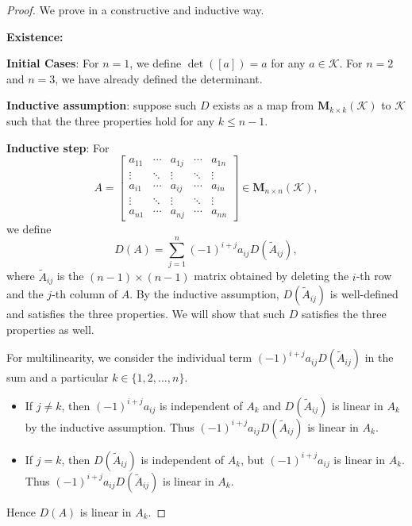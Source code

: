 \documentclass{ctexart}
\begin{document}
    \begin{proof}
        We prove in a constructive and inductive way.

        \noindent
        \textbf{Existence:} 
        
        \textbf{Initial Cases}: For $n=1$, we define $\det([a]) = a$ for any $a \in \mathcal{K}$. For $n=2$ and $n=3$, we have already defined the determinant.

        \textbf{Inductive assumption}: suppose such $D$ exists as a map from $\mathbf{M}_{k \times k}(\mathcal{K})$ to $\mathcal{K}$ such that the three properties hold for any $ k \le n-1$.

        \textbf{Inductive step}: For
        \[
        A = \begin{bmatrix}
            a_{11} & \cdots & a_{1j} & \cdots & a_{1n} \\
            \vdots & \ddots & \vdots & \ddots & \vdots \\
            a_{i1} & \cdots & a_{ij} & \cdots & a_{in} \\
            \vdots & \ddots & \vdots & \ddots & \vdots \\
            a_{n1} & \cdots & a_{nj} & \cdots & a_{nn}
        \end{bmatrix} \in \mathbf{M}_{n \times n}(\mathcal{K}),
        \]
        we define
        \[
        D(A) = \sum_{j=1}^n (-1)^{i+j} a_{ij} D(\tilde{A}_{ij}),
        \]
        where $\tilde{A}_{ij}$ is the $(n-1)\times (n-1)$ matrix obtained by deleting the $i$-th row and the $j$-th column of $A$. By the inductive assumption, $D(\tilde{A}_{ij})$ is well-defined and satisfies the three properties. We will show that such $D$ satisfies the three properties as well.

        For multilinearity, we consider the individual term $(-1)^{i+j} a_{ij} D(\tilde{A}_{ij})$ in the sum and a particular $k\in \{1,2,\ldots,n\}$.
        \begin{itemize}
            \item If $j\neq k$, then $(-1)^{i+j} a_{ij} $ is independent of $A_k$ and $D(\tilde{A}_{ij})$ is linear in $A_k$ by the inductive assumption. Thus $(-1)^{i+j} a_{ij} D(\tilde{A}_{ij})$ is linear in $A_k$.
            \item If $j=k$, then $D(\tilde{A}_{ij})$ is independent of $A_k$, but $(-1)^{i+j} a_{ij}$ is linear in $A_k$. Thus $(-1)^{i+j} a_{ij} D(\tilde{A}_{ij})$ is linear in $A_k$.
        \end{itemize}
        Hence $D(A)$ is linear in $A_k$.


\end{proof}
\end{document}
